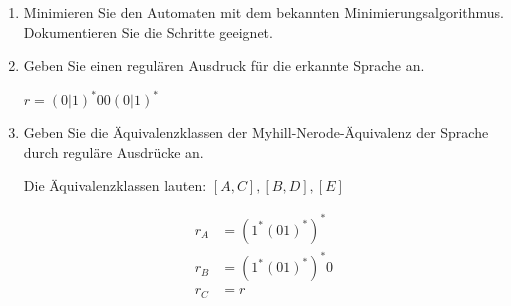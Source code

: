 \documentclass{lehramt-informatik-aufgabe}
\begin{document}
\begin{enumerate}
\item Minimieren Sie den Automaten mit dem bekannten
Minimierungsalgorithmus. Dokumentieren Sie die Schritte geeignet.

\begin{liAntwort}
\begin{center}
\end{center}

\end{liAntwort}

\item Geben Sie einen regulären Ausdruck für die erkannte Sprache an.

\begin{liAntwort}
$r = (0|1)^*00(0|1)^*$
\end{liAntwort}

\item Geben Sie die Äquivalenzklassen der Myhill-Nerode-Äquivalenz der
Sprache durch reguläre Ausdrücke an.

\begin{liAntwort}
Die Äquivalenzklassen lauten: $[A, C], [B, D], [E]$

\begin{align*}
r_A &= (1^*(01)^*)^*\\
r_B &= (1^*(01)^*)^*0\\
r_C &= r\\
\end{align*}
\end{liAntwort}
\end{enumerate}
\end{document}
